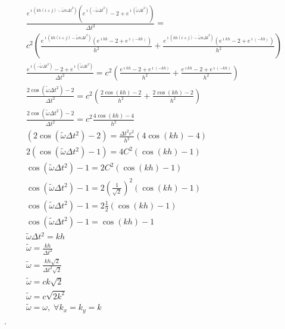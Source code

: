 \documentclass[12pt, a4paper]{article}
\begin{document}
\begin{align*}
    \frac{e^{\imath (kh(i+j) - \tilde{\omega} n \Delta t^2)}(e^{\imath ( - \tilde{\omega} \Delta t^2)} - 2 + e^{\imath (\tilde{\omega} \Delta t^2)})}{\Delta t^2} = \\
    c^2 \left(\frac{ e^{\imath (kh(i+j) - \tilde{\omega} n \Delta t^2)} (e^{\imath kh} - 2 + e^{\imath (-kh)})}{h^2} + \frac{ e^{\imath (kh(i+j) - \tilde{\omega} n \Delta t^2)} (e^{\imath kh} - 2 + e^{\imath (-kh)})}{h^2} \right) \\
    \frac{e^{\imath ( - \tilde{\omega} \Delta t^2)} - 2 + e^{\imath (\tilde{\omega} \Delta t^2)}}{\Delta t^2} =
    c^2 \left(\frac{ e^{\imath kh} - 2 + e^{\imath (-kh)}}{h^2} + \frac{ e^{\imath kh} - 2 + e^{\imath (-kh)}}{h^2} \right) \\
    \frac{ 2 \cos(\tilde{\omega} \Delta t^2) - 2}{\Delta t^2} = c^2 \left( \frac{ 2 \cos(kh) - 2}{h^2} + \frac{ 2 \cos(kh) - 2 }{h^2} \right) \\
    \frac{ 2 \cos(\tilde{\omega} \Delta t^2) - 2}{\Delta t^2} = c^2 \frac{ 4 \cos(kh) - 4}{h^2} \\
    ( 2 \cos(\tilde{\omega} \Delta t^2) - 2) = \frac{\Delta t^2 c^2}{h^2} (4 \cos(kh) - 4) \\
    2 ( \cos(\tilde{\omega} \Delta t^2) - 1) = 4 C^2 (\cos(kh) - 1) \\
    \cos(\tilde{\omega} \Delta t^2) - 1 = 2 C^2 (\cos(kh) - 1) \\
    \cos(\tilde{\omega} \Delta t^2) - 1 = 2 \left( \frac{1}{\sqrt{2}} \right)^2 (\cos(kh) - 1) \\
    \cos(\tilde{\omega} \Delta t^2) - 1 = 2 \frac{1}{2} (\cos(kh) - 1) \\
    \cos(\tilde{\omega} \Delta t^2) - 1 = \cos(kh) - 1 \\
    \tilde{\omega} \Delta t^2 = kh \\
    \tilde{\omega} = \frac{kh}{\Delta t^2} \\
    \tilde{\omega} = \frac{kh \sqrt{2}}{\Delta t^2 \sqrt{2}} \\
    \tilde{\omega} = c k \sqrt{2} \\
    \tilde{\omega} = c \sqrt{2 k^2} \\
    \tilde{\omega} = \omega, \; \forall k_x = k_y = k
\end{align*}.
\end{document}

